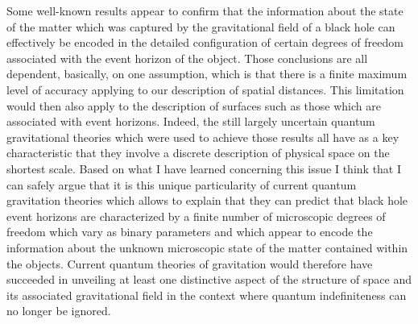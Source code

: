 \documentclass[notitlepage,12pt]{report}
\begin{document}
Some well-known results appear to confirm that the information about the state of the matter which was captured by the gravitational field of a black hole can effectively be encoded in the detailed configuration of certain degrees of freedom associated with the event horizon of the object. Those conclusions are all dependent, basically, on one assumption, which is that there is a finite maximum level of accuracy applying to our description of spatial distances. This limitation would then also apply to the description of surfaces such as those which are associated with event horizons. Indeed, the still largely uncertain quantum gravitational theories which were used to achieve those results all have as a key characteristic that they involve a discrete description of physical space on the shortest scale. Based on what I have learned concerning this issue I think that I can safely argue that it is this unique particularity of current quantum gravitation theories which allows to explain that they can predict that black hole event horizons are characterized by a finite number of microscopic degrees of freedom which vary as binary parameters and which appear to encode the information about the unknown microscopic state of the matter contained within the objects. Current quantum theories of gravitation would therefore have succeeded in unveiling at least one distinctive aspect of the structure of space and its associated gravitational field in the context where quantum indefiniteness can no longer be ignored.
\end{document}
